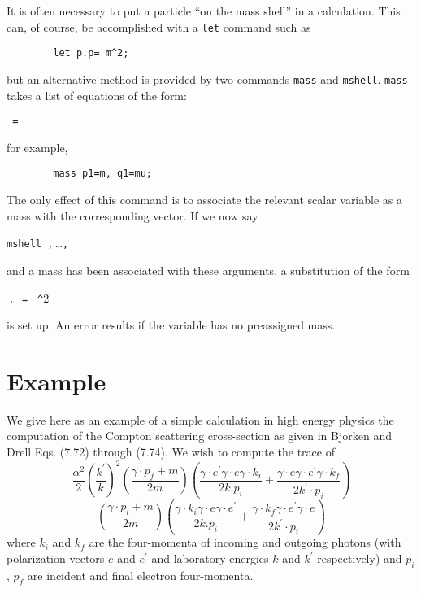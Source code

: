 It is often necessary to put a particle ``on the mass shell'' in a
calculation.  This can, of course, be accomplished with a \texttt{let}
command such as
\begin{verbatim}
        let p.p= m^2;
\end{verbatim}
but an alternative method is provided by two commands \texttt{mass} and
\texttt{mshell}.
\texttt{mass} takes a list of equations of the form:
\begin{syntax}
  \texttt{ = }
\end{syntax}
for example,
\begin{verbatim}
        mass p1=m, q1=mu;
\end{verbatim}
The only effect of this command is to associate the relevant scalar
variable as a mass with the corresponding vector. If we now say
\begin{syntax}
  \texttt{mshell }\texttt{,}\,\dots\texttt{,}\,
\end{syntax}
and a mass has been associated with these arguments, a substitution of the
form
\begin{syntax}
  \,\texttt{.}\,\texttt{ = }%
    \texttt{\textasciicircum}2
\end{syntax}
is set up. An error results if the variable has no preassigned mass.

\section{Example}

We give here as an example of a simple calculation in high energy physics
the computation of the Compton scattering cross-section as given in
Bjorken and Drell Eqs. (7.72) through (7.74). We wish to compute the trace of
\[
\frac{\alpha^2}{2} \left(\frac{k^\prime}{k}\right)^2
 \left(\frac{\gamma\cdot p_f+m}{2m}\right)\left(\frac{\gamma\cdot e^\prime \gamma\cdot e
 \gamma\cdot k_i}{2k.p_i} + \frac{\gamma\cdot e\gamma\cdot e^\prime
 \gamma\cdot k_f}{2k^\prime\cdot p_i}\right)
\]
\[
 \left(\frac{\gamma\cdot p_i+m}{2m}\right)
 \left(\frac{\gamma\cdot k_i\gamma\cdot e\gamma\cdot e^\prime}{2k.p_i} +
 \frac{\gamma\cdot k_f\gamma\cdot e^\prime\gamma\cdot e}{2k^\prime\cdot p_i}
 \right)
\]
where $k_i$ and $k_f$ are the four-momenta of incoming and outgoing photons
(with polarization vectors $e$ and $e^\prime$ and laboratory energies
$k$ and $k^\prime$
respectively) and $p_i$, $p_f$ are incident and final electron four-momenta.


